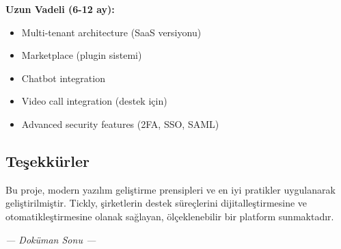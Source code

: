 \documentclass[12pt,a4paper]{article}
\begin{document}
\textbf{Uzun Vadeli (6-12 ay):}
\begin{itemize}
    \item Multi-tenant architecture (SaaS versiyonu)
    \item Marketplace (plugin sistemi)
    \item Chatbot integration
    \item Video call integration (destek için)
    \item Advanced security features (2FA, SSO, SAML)
\end{itemize}

\subsection{Teşekkürler}

Bu proje, modern yazılım geliştirme prensipleri ve en iyi pratikler uygulanarak geliştirilmiştir. Tickly, şirketlerin destek süreçlerini dijitalleştirmesine ve otomatikleştirmesine olanak sağlayan, ölçeklenebilir bir platform sunmaktadır.

\vspace{1cm}

\begin{center}
\textit{--- Doküman Sonu ---}
\end{center}
\end{document}
